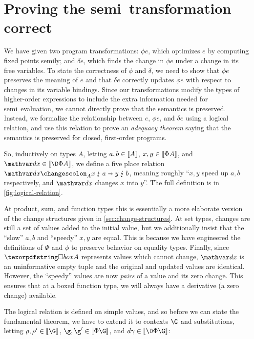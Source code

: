 \section{Proving the semi\naive\ transformation correct}
\label{sec:logical-relation}

We have given two program transformations: $\phi e$, which optimizes $e$ by
computing fixed points semi\naive{}ly; and $\delta e$, which finds the change in
$\phi e$ under a change in its free variables.
%
To state the correctness of $\phi$ and $\delta$, we need to show that $\phi e$
preserves the meaning of $e$ and that $\delta e$ correctly updates $\phi e$ with
respect to changes in its variable bindings.
%
Since our transformations modify the types of higher-order expressions to
include the extra information needed for semi\naive\ evaluation, we cannot
directly prove that the semantics is preserved.
%
Instead, we formalize the relationship between $e$, $\phi e$, and $\delta e$
using a logical relation, and use this relation to prove an \emph{adequacy
  theorem} saying that the semantics is preserved for closed, first-order
programs.



So, inductively on types $A$, letting $a,b \in \llbracket{A}\rrbracket$, $x,y \in \llbracket{\Phi A}\rrbracket$,
and $\dx \in \den{\DP A}$, we define a five place relation
$\weirdat{A}{\dx}{x}{a}{y}{b}$, meaning roughly ``$x,y$ speed up $a,b$
respectively, and $\dx$ changes $x$ into $y$''. The full definition is in
\cref{fig:logical-relation}.

At product, sum, and function types this is essentially a more elaborate version
of the change structures given in \cref{sec:change-structures}.
%
At set types, changes are still a set of values added to the initial value, but
we additionally insist that the ``slow'' $a,b$ and ``speedy'' $x,y$ are equal.
%
This is because we have engineered the definitions of $\Phi$ and $\phi$ to
preserve behavior on equality types.
%
Finally, since $\iso A$ represents values which cannot change, $\dx$ is an
uninformative empty tuple and the original and updated values are identical.
%
However, the ``speedy'' values are now \emph{pairs} of a value and its zero
change.
%
This ensures that at a boxed function type, we will always have a derivative (a
zero change) available.

The logical relation is defined on simple values, and so before we can state the
fundamental theorem, we have to extend it to contexts $\G$ and substitutions,
letting $\rho,\rho' \in \den{\G}$, $\g,\g' \in \den{\Phi\G}$, and $\dgamma \in
\den{\DP\G}$:

